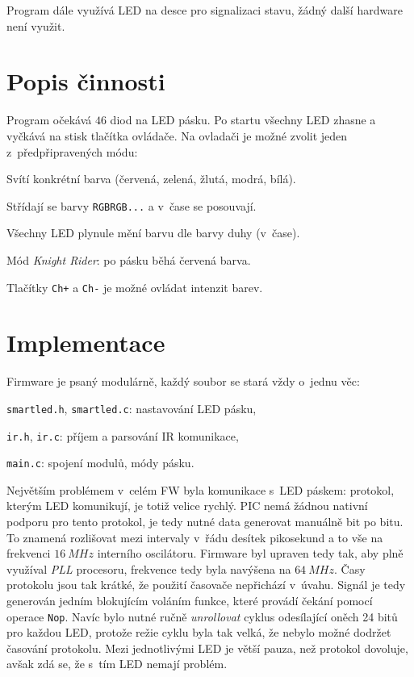 \documentclass[12pt,a4paper]{article}
\begin{document}
Program dále využívá LED na desce pro signalizaci stavu, žádný další hardware
není využit.

\section{Popis činnosti}

Program očekává $46$ diod na LED pásku. Po startu všechny LED zhasne a vyčkává
na stisk tlačítka ovládače. Na ovladači je možné zvolit jeden z~předpřipravených
módu:

\begin{compactenum}
\item Svítí konkrétní barva (červená, zelená, žlutá, modrá, bílá).
\item Střídají se barvy \texttt{RGBRGB...} a v~čase se posouvají.
\item Všechny LED plynule mění barvu dle barvy duhy (v~čase).
\item Mód \textit{Knight Rider}: po pásku běhá červená barva.
\end{compactenum}

Tlačítky \texttt{Ch+} a \texttt{Ch-} je možné ovládat intenzit barev.

\section{Implementace}

Firmware je psaný modulárně, každý soubor se stará vždy o~jednu věc:
\begin{compactitem}
	\item \texttt{smartled.h}, \texttt{smartled.c}: nastavování LED pásku,
	\item \texttt{ir.h}, \texttt{ir.c}: příjem a parsování IR komunikace,
	\item \texttt{main.c}: spojení modulů, módy pásku.
\end{compactitem}

Největším problémem v~celém FW byla komunikace s~LED páskem: protokol, kterým
LED komunikují, je totiž velice rychlý. PIC nemá žádnou nativní podporu pro
tento protokol, je tedy nutné data generovat manuálně bit po bitu. To znamená
rozlišovat mezi intervaly v~řádu desítek pikosekund a to vše na frekvenci $16\
MHz$ interního oscilátoru. Firmware byl upraven tedy tak, aby plně využíval
\textit{PLL} procesoru, frekvence tedy byla navýšena na $64\ MHz$. Časy
protokolu jsou tak krátké, že použití časovače nepřichází v~úvahu. Signál je
tedy generován jedním blokujícím voláním funkce, které provádí čekání pomocí
operace \texttt{Nop}.  Navíc bylo nutné ručně \textit{unrollovat} cyklus
odesílající oněch 24 bitů pro každou LED, protože režie cyklu byla tak velká,
že nebylo možné dodržet časování protokolu. Mezi jednotlivými LED je větší
pauza, než protokol dovoluje, avšak zdá se, že s~tím LED nemají problém.
\end{document}
